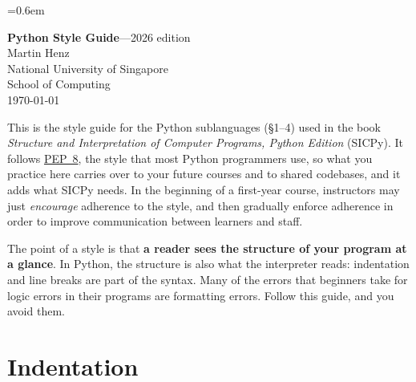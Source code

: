 

\lstset{language=PythonStyle, keywordstyle=\bfseries, keywordstyle=[2]\bfseries,
  commentstyle=\itshape}

\parindent=0pt
\parskip=0.6em


  \thispagestyle{empty}

  \begin{center}
    {\Large {\bf Python Style Guide}---2026 edition}\\[10mm]

    {\large Martin Henz}\\[5mm]

    {\large National University of Singapore \\
    School of Computing}\\[10mm]

    {\large \today}\\[10mm]
  \end{center}

\noindent
This is the style guide for the Python sublanguages (\S 1--4) used in the book
\emph{Structure and Interpretation of Computer Programs, Python Edition} (SICPy).
It follows \href{https://peps.python.org/pep-0008/}{PEP~8}, the style that most Python programmers use,
so what you practice here carries over to your future courses and to shared codebases,
and it adds what SICPy needs.
In the beginning of a first-year course, instructors may just \emph{encourage}
adherence to the style, and then gradually enforce adherence in order to
improve communication between learners and staff.

The point of a style is that \textbf{a reader sees the structure of your program at a glance}.
In Python, the structure is also what the interpreter reads: indentation and line breaks are part
of the syntax. Many of the errors that beginners take for logic errors in their programs are
formatting errors. Follow this guide, and you avoid them.

\section*{Indentation}

